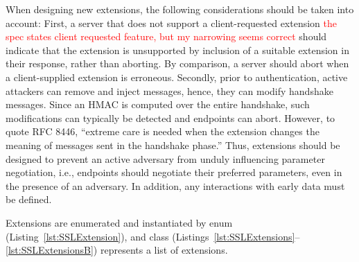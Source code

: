 When designing new extensions, the following considerations should 
be taken into account:
%
First, a server that does not support a client-requested extension 
\ifSpecNotes
  \textcolor{red}{the spec states client requested feature, but my 
  narrowing seems correct}
\fi
  should indicate that the extension is unsupported by inclusion 
  of a suitable extension in their response, rather than aborting.
  By comparison, a server should abort when a client-supplied
  extension is erroneous. 
%
Secondly, prior to authentication, active attackers can remove and 
  inject messages, hence, they can modify handshake messages. 
  Since an HMAC is computed over the entire handshake, such 
  modifications can typically be detected and endpoints can 
  abort. However, to quote RFC 8446, ``extreme care is needed 
  when the extension changes the meaning of messages sent in the 
  handshake phase.'' Thus, extensions should be designed to 
  prevent an active adversary from unduly influencing parameter 
  negotiation, i.e., endpoints should negotiate their preferred
  parameters, even in the presence of an adversary.
%
In addition, any interactions with early data must be defined.




\begin{tcolorbox}
Extensions are enumerated and instantiated by enum  (Listing~\ref{lst:SSLExtension}), 
and class  (Listings~\ref{lst:SSLExtensions}--\ref{lst:SSLExtensionsB}) represents
a list of extensions.
\end{tcolorbox}

